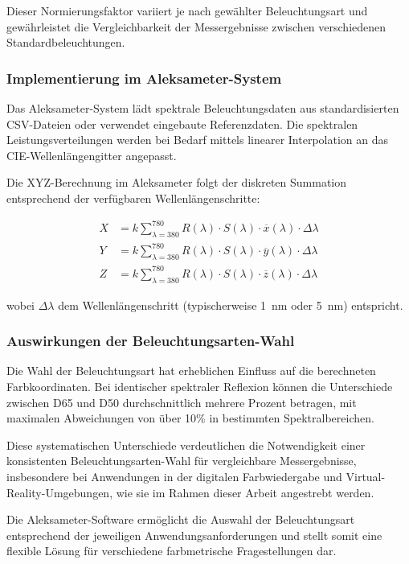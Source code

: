 Dieser Normierungsfaktor variiert je nach gewählter Beleuchtungsart und gewährleistet die Vergleichbarkeit der Messergebnisse zwischen verschiedenen Standardbeleuchtungen.

\subsubsection{Implementierung im Aleksameter-System}

Das Aleksameter-System lädt spektrale Beleuchtungsdaten aus standardisierten CSV-Dateien oder verwendet eingebaute Referenzdaten. Die spektralen Leistungsverteilungen werden bei Bedarf mittels linearer Interpolation an das CIE-Wellenlängengitter angepasst.

Die XYZ-Berechnung im Aleksameter folgt der diskreten Summation entsprechend der verfügbaren Wellenlängenschritte:

\begin{align}
X &= k \sum_{\lambda=380}^{780} R(\lambda) \cdot S(\lambda) \cdot \overline{x}(\lambda) \cdot \Delta\lambda \\
Y &= k \sum_{\lambda=380}^{780} R(\lambda) \cdot S(\lambda) \cdot \overline{y}(\lambda) \cdot \Delta\lambda \\
Z &= k \sum_{\lambda=380}^{780} R(\lambda) \cdot S(\lambda) \cdot \overline{z}(\lambda) \cdot \Delta\lambda
\end{align}

wobei $\Delta\lambda$ dem Wellenlängenschritt (typischerweise \SI{1}{\nano\meter} oder \SI{5}{\nano\meter}) entspricht.

\subsubsection{Auswirkungen der Beleuchtungsarten-Wahl}

Die Wahl der Beleuchtungsart hat erheblichen Einfluss auf die berechneten Farbkoordinaten. Bei identischer spektraler Reflexion können die Unterschiede zwischen D65 und D50 durchschnittlich mehrere Prozent betragen, mit maximalen Abweichungen von über 10\% in bestimmten Spektralbereichen.

Diese systematischen Unterschiede verdeutlichen die Notwendigkeit einer konsistenten Beleuchtungsarten-Wahl für vergleichbare Messergebnisse, insbesondere bei Anwendungen in der digitalen Farbwiedergabe und Virtual-Reality-Umgebungen, wie sie im Rahmen dieser Arbeit angestrebt werden.

Die Aleksameter-Software ermöglicht die Auswahl der Beleuchtungsart entsprechend der jeweiligen Anwendungsanforderungen und stellt somit eine flexible Lösung für verschiedene farbmetrische Fragestellungen dar.

